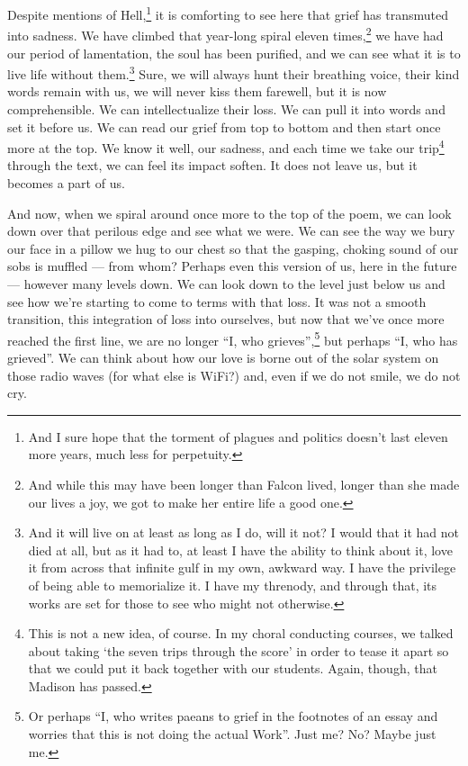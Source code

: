 Despite mentions of Hell,\footnote{And I sure hope that the torment of plagues and politics doesn't last eleven more years, much less for perpetuity.} it is comforting to see here that grief has transmuted into sadness. We have climbed that year-long spiral eleven times,\footnote{And while this may have been longer than Falcon lived, longer than she made our lives a joy, we got to make her entire life a good one.} we have had our period of lamentation, the soul has been purified, and we can see what it is to live life without them.\footnote{And it will live on at least as long as I do, will it not? I would that it had not died at all, but as it had to, at least I have the ability to think about it, love it from across that infinite gulf in my own, awkward way. I have the privilege of being able to memorialize it. I have my threnody, and through that, its works are set for those to see who might not otherwise.} Sure, we will always hunt their breathing voice, their kind words remain with us, we will never kiss them farewell, but it is now comprehensible. We can intellectualize their loss. We can pull it into words and set it before us. We can read our grief from top to bottom and then start once more at the top. We know it well, our sadness, and each time we take our trip\footnote{This is not a new idea, of course. In my choral conducting courses, we talked about taking `the seven trips through the score' in order to tease it apart so that we could put it back together with our students. Again, though, that Madison has passed.} through the text, we can feel its impact soften. It does not leave us, but it becomes  a part of us.

And now, when we spiral around once more to the top of the poem, we can look down over that perilous edge and see what we were. We can see the way we bury our face in a pillow we hug to our chest so that the gasping, choking sound of our sobs is muffled --- from whom? Perhaps even this version of us, here in the future --- however many levels down. We can look down to the level just below us and see how we're starting to come to terms with that loss. It was not a smooth transition, this integration of loss into ourselves, but now that we've once more reached the first line, we are no longer ``I, who grieves'',\footnote{Or perhaps ``I, who writes paeans to grief in the footnotes of an essay and worries that this is not doing the actual Work''. Just me? No? Maybe just me.} but perhaps ``I, who has grieved''. We can think about how our love is borne out of the solar system on those radio waves (for what else is WiFi?) and, even if we do not smile, we do not cry.

